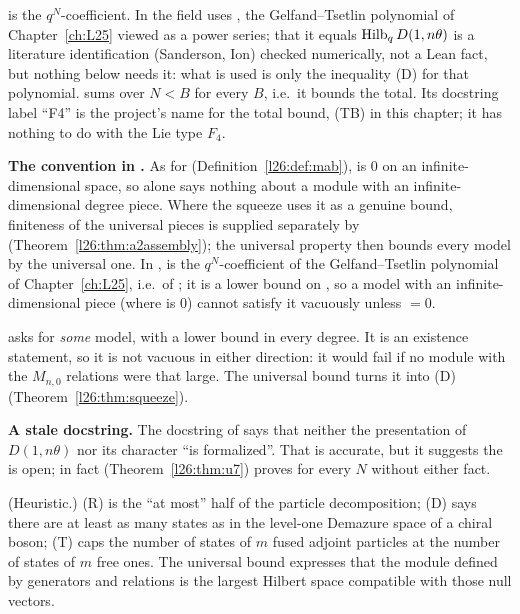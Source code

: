 \begin{dictionary}
 is the $q^N$-coefficient. In  the field  uses
, the Gelfand--Tsetlin polynomial of Chapter~\ref{ch:L25} viewed as a power series; that it
equals $\operatorname{Hilb}_qD(1,n\theta)$ is a literature identification (Sanderson, Ion) checked numerically, not a Lean
fact, but nothing below needs it: what is used is only the inequality (D) for that polynomial.  sums
over $N<B$ for every $B$, i.e.\ it bounds the total. Its docstring label ``F4'' is the project's name for the total bound,
(TB) in this chapter; it has nothing to do with the Lie type $F_4$.

\textbf{The  convention in .} As for 
(Definition~\ref{l26:def:mab}),  is $0$ on an infinite-dimensional space, so 
alone says nothing about a module with an infinite-dimensional degree piece. Where the squeeze uses it as a genuine bound,
finiteness of the universal pieces is supplied separately by  (Theorem~\ref{l26:thm:a2assembly}); the
universal property then bounds every model by the universal one. In , 
is the $q^N$-coefficient of the Gelfand--Tsetlin polynomial  of Chapter~\ref{ch:L25}, i.e.\ of
; it is a lower bound on , so a model with an infinite-dimensional piece (where
 is $0$) cannot satisfy it vacuously unless  $=0$.

 asks for \emph{some} model, with a lower bound in every degree. It is an existence
statement, so it is not vacuous in either direction: it would fail if no module with the $M_{n,0}$ relations were that
large. The universal bound turns it into (D) (Theorem~\ref{l26:thm:squeeze}).

\textbf{A stale docstring.} The docstring of  says that neither the presentation of $D(1,n\theta)$
nor its character ``is formalized''. That is accurate, but it suggests the  is open; in fact
 (Theorem~\ref{l26:thm:u7}) proves  for every $N$ without
either fact.
\end{dictionary}

\begin{physics}
(Heuristic.) (R) is the ``at most'' half of the particle decomposition; (D) says there are at least as many states as in the
level-one Demazure space of a chiral boson; (T) caps the number of states of $m$ fused adjoint particles at the number
of states of $m$ free ones. The universal bound expresses that the module defined by generators and relations is the
largest Hilbert space compatible with those null vectors.
\end{physics}

